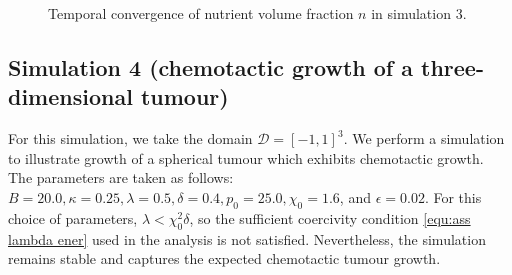 \documentclass[11pt, reqno]{amsart}
\theoremstyle{definition}
\numberwithin{equation}{section}
\newcommand{\norm}[2]{\left\|{#1}\right\|_{#2}}
\begin{document}
\begin{figure}[!htb]
		\caption{Temporal convergence of nutrient volume fraction $n$ in simulation 3.}
		\label{fig:order n temp}
\end{figure}





\subsection{Simulation 4 (chemotactic growth of a three-dimensional tumour)}

For this simulation, we take the domain $\mathscr{D}=[-1,1]^3$. We perform a simulation to illustrate growth of a spherical tumour which exhibits chemotactic growth.  The parameters are taken as follows: $B=20.0, \kappa=0.25, \lambda=0.5, \delta=0.4, p_0=25.0, \chi_0=1.6$, and $\epsilon=0.02$. For this choice of parameters, $\lambda<\chi_0^2 \delta$, so the sufficient coercivity condition \eqref{equ:ass lambda ener} used in the analysis is not satisfied. Nevertheless, the simulation remains stable and captures the expected chemotactic tumour growth.
\end{document}
